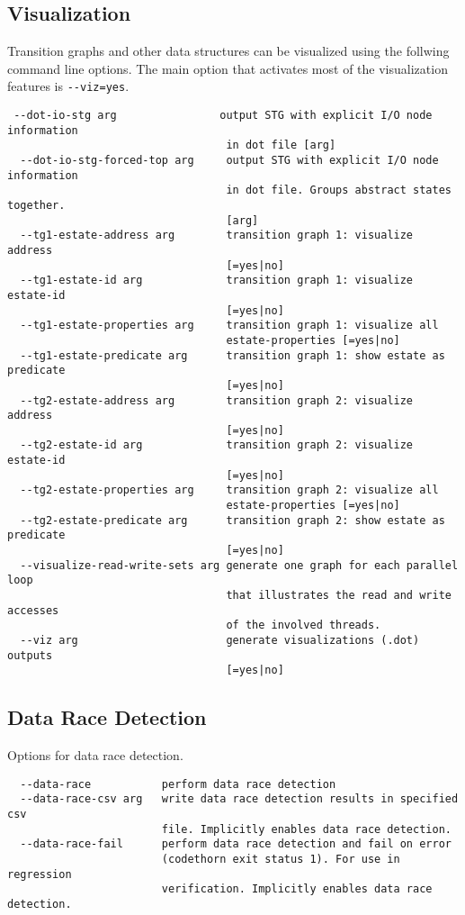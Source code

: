 \documentclass[natbib]{article}
\begin{document}
\subsection{Visualization}
Transition graphs and other data structures can be visualized using the follwing command line options.
The main option that activates most of the visualization features is \verb+--viz=yes+.
\begin{verbatim}
 --dot-io-stg arg                output STG with explicit I/O node information
                                  in dot file [arg]
  --dot-io-stg-forced-top arg     output STG with explicit I/O node information
                                  in dot file. Groups abstract states together.
                                  [arg]
  --tg1-estate-address arg        transition graph 1: visualize address 
                                  [=yes|no]
  --tg1-estate-id arg             transition graph 1: visualize estate-id 
                                  [=yes|no]
  --tg1-estate-properties arg     transition graph 1: visualize all 
                                  estate-properties [=yes|no]
  --tg1-estate-predicate arg      transition graph 1: show estate as predicate 
                                  [=yes|no]
  --tg2-estate-address arg        transition graph 2: visualize address 
                                  [=yes|no]
  --tg2-estate-id arg             transition graph 2: visualize estate-id 
                                  [=yes|no]
  --tg2-estate-properties arg     transition graph 2: visualize all 
                                  estate-properties [=yes|no]
  --tg2-estate-predicate arg      transition graph 2: show estate as predicate 
                                  [=yes|no]
  --visualize-read-write-sets arg generate one graph for each parallel loop 
                                  that illustrates the read and write accesses 
                                  of the involved threads.
  --viz arg                       generate visualizations (.dot) outputs 
                                  [=yes|no]
\end{verbatim}


\subsection{Data Race Detection}
Options for data race detection.
\begin{verbatim}
  --data-race           perform data race detection
  --data-race-csv arg   write data race detection results in specified csv 
                        file. Implicitly enables data race detection.
  --data-race-fail      perform data race detection and fail on error 
                        (codethorn exit status 1). For use in regression 
                        verification. Implicitly enables data race detection.
\end{verbatim}
\end{document}
